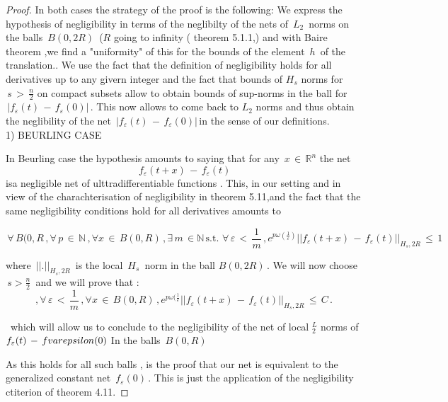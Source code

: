 \documentclass[12pt,a4paper]{amsart}
\newcommand{\NN}{\mathbb N}
\newcommand{\RR}{\mathbb R}
\begin{document}
\begin{proof}
 In both cases the strategy of the proof is the following:
 We express the hypothesis of negligibility in terms of the neglibilty of the nets of $\,L_2\,$ norms on the balls $\,B(0,2R)\,$ ($R$ going to infinity ( theorem 5.1.1,) and with Baire theorem  ,we find a "uniformity" of this for the bounds of the  element $\,h\,$ of the translation..  We use the fact that the definition of negligibility holds for all derivatives up to any givern integer and the fact that bounds of $ H_s   $ norms for
  $\,s\,>\, \frac{n}{2}$ on compact subsets
 allow to obtain bounds of sup-norms in the ball for
  $\,|f_\varepsilon(t)\,-\,f_\varepsilon(0)|\,.$ This now allows to come back to $L_2$ norms and thus obtain the neglibility 
   of the net  $\,|f_\varepsilon(t)\,-\,f_\varepsilon(0)|\,$in the sense of our definitions. 
   \\
1) BEURLING CASE



In Beurling case the hypothesis amounts to saying that for any
 $\, x \,\in\,\RR^n$  the net
$$\,f_\varepsilon(t+x)\,-\,f_\varepsilon(t)$$ isa negligible net of ulttradifferentiable functions .
 This, in our setting and in view of the charachterisation of negligibility in theorem 5.11,and the fact that the same negligibility conditions hold for all derivatives  amounts to  
 

$$\,\forall \,B(0,R\,,\forall\,p\,\in \,\NN\,,\forall x \,\in\,B(0,R)\,,\exists \,m\,\in \NN \,\mbox{s.t.}\,
\,\forall \,\varepsilon \,<\,\frac{1}{m}\,,
e^{p\omega(\frac{1}{\varepsilon})}||f_\varepsilon(t+x)\,-\,
f_\varepsilon(t) ||_{H_s,2R}\,\leq\,1 $$


 where $\,||.||_{H_s,2R}\,$ is the local $\,H_s\,$ norm in the ball  $B(0,2R)\,.$
 We will now choose $\, s>\frac{n}{2}\,$ and we will prove that :
$$,\forall \,\varepsilon \,<\,\frac{1}{m}\,, \forall x\,\in\,B(0,R)\,,
e^{p\omega(\frac{1}{\varepsilon}}||f_\varepsilon(t+x)\,-\,
f_\varepsilon(t) ||_{H_s,2R}\,\leq\,C\,.$$

\  which will allow us to conclude to the negligibility of the net of local  $^L_2$ norms of
   $f_\varepsilon(t) \,-\,f\\varepsilon(0)$ In the balls  
   $\,B(0,R)\,$
    
    As this holds for all such balls ,  is the proof that our net is equivalent to the  generalized constant net
     $  \,f_\varepsilon(0)\,.$ 
  This is just the application of the negligibility ctiterion of theorem 4.11.
 

\end{proof}
\end{document}
